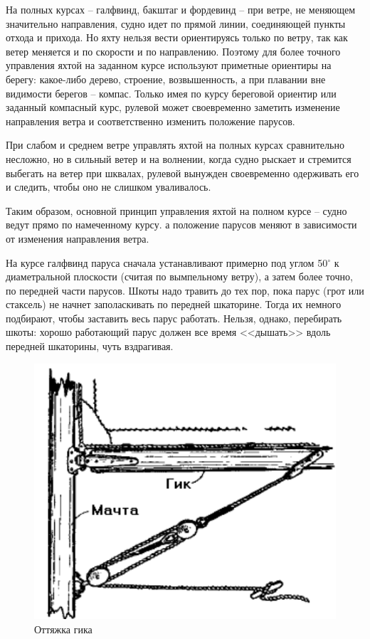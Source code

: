 \documentclass[a4paper, 12pt, twoside, final]{scrbook}
\begin{document}
На полных курсах \--- галфвинд, бакштаг и фордевинд \--- при ветре, не меняющем значительно направления, судно идет по прямой линии, соединяющей пункты отхода и прихода. Но яхту нельзя вести ориентируясь только по ветру, так как ветер меняется и по скорости и по направлению. Поэтому для более точного управления яхтой на заданном курсе используют приметные ориентиры на берегу: какое-либо дерево, строение, возвышенность, а при плавании вне видимости берегов \--- компас. Только имея по курсу береговой ориентир или заданный компасный курс, рулевой может своевременно заметить изменение направления ветра и соответственно изменить положение парусов.

При слабом и среднем ветре управлять яхтой на полных курсах сравнительно несложно, но в сильный ветер и на волнении, когда судно рыскает и стремится выбегать на ветер при шквалах, рулевой вынужден своевременно одерживать его и следить, чтобы оно не слишком уваливалось.

Таким образом, основной принцип управления яхтой на полном курсе \--- судно ведут прямо по намеченному курсу. а положение парусов меняют в зависимости от изменения направления ветра.

На курсе галфвинд паруса сначала устанавливают примерно под углом 50$^\circ$ к диаметральной плоскости (считая по вымпельному ветру), а затем более точно, по передней части парусов. Шкоты надо травить до тех пор, пока парус (грот или стаксель) не начнет заполаскивать по передней шкаторине. Тогда их немного подбирают, чтобы заставить весь парус работать. Нельзя, однако, перебирать шкоты: хорошо работающий парус должен все время <<дышать>> вдоль передней шкаторины, чуть вздрагивая.

\begin{figure}
	\centering
	\includegraphics[scale=1]{113_Ottjazhka_gika}
	\caption{Оттяжка гика}
	\label{fig:113}
\end{figure}
\end{document}
